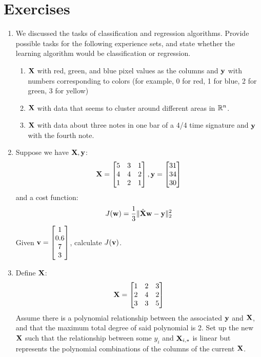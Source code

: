 \section{Exercises}

\begin{enumerate}
    \item We discussed the tasks of classification and regression algorithms. Provide possible tasks for the following experience sets, and state whether the learning algorithm would be classification or regression.
    \begin{enumerate}
        \item $\MX$ with red, green, and blue pixel values as the columns and $\vy$ with numbers corresponding to colors (for example, 0 for red, 1 for blue, 2 for green, 3 for yellow)
        \item $\MX$ with data that seems to cluster around different areas in $\R^n$.
        \item $\MX$ with data about three notes in one bar of a 4/4 time signature and $\vy$ with the fourth note.
    \end{enumerate}
    \item Suppose we have $\MX, \vy$:
    $$ \MX = \begin{bmatrix}
    5 & 3 & 1\\
    4 & 4 & 2\\
    1 & 2 & 1
    \end{bmatrix}, \vy =
    \begin{bmatrix}
    31\\
    34\\
    30
    \end{bmatrix} $$
    and a cost function:
    $$ J(\vw) = \frac{1}{3} \lVert \hat{\MX} \vw - \vy \rVert_2^2$$
    Given $\vv = \begin{bmatrix}
    1\\
    0.6\\
    7\\
    3
    \end{bmatrix}$, calculate $J(\vv)$.
    \item Define $\MX$:
    $$\MX =
    \begin{bmatrix}
    1&2&3\\
    2&4&2\\
    3&3&5
    \end{bmatrix}$$
    Assume there is a polynomial relationship between the associated $\vy$ and $\MX$, and that the maximum total degree of said polynomial is 2. Set up the new $\MX$ such that the relationship between some $y_i$ and $\MX_{i,\ast}$ is linear but represents the polynomial combinations of the columns of the current $\MX$.
\end{enumerate}

